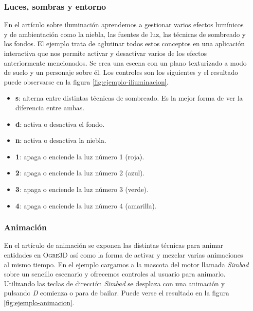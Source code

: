 
\subsubsection{Luces, sombras y entorno}

En el artículo sobre iluminación aprendemos a gestionar varios efectos
lumínicos y de ambientación como la niebla, las fuentes de luz, las técnicas
de sombreado y los fondos. El ejemplo trata de aglutinar todos estos conceptos
en una aplicación interactiva que nos permite activar y desactivar varios
de los efectos anteriormente mencionados. Se crea una escena con un
plano texturizado a modo de suelo y un personaje sobre él. Los controles
son los siguientes y el resultado puede observarse en la figura \ref{fig:ejemplo-iliuminacion}.

\begin{itemize}
    \itemsep0em
    \item \textbf{s}: alterna entre distintas técnicas de sombreado. Es
    la mejor forma de ver la diferencia entre ambas.
    \item \textbf{d}: activa o desactiva el fondo.
    \item \textbf{n}: activa o desactiva la niebla.
    \item \textbf{1}: apaga o enciende la luz número 1 (roja).
    \item \textbf{2}: apaga o enciende la luz número 2 (azul).
    \item \textbf{3}: apaga o enciende la luz número 3 (verde).
    \item \textbf{4}: apaga o enciende la luz número 4 (amarilla).
\end{itemize}


\subsubsection{Animación}

En el artículo de animación se exponen las distintas técnicas para animar
entidades en \textsc{Ogre3D} así como la forma de activar y mezclar
varias animaciones al mismo tiempo. En el ejemplo cargamos a la mascota del
motor llamada \textit{Simbad} sobre un sencillo escenario y ofrecemos
controles al usuario para animarlo. Utilizando las teclas de dirección
\textit{Simbad} se desplaza con una animación y pulsando \textit{D} comienza
o para de bailar. Puede verse el resultado en la figura \ref{fig:ejemplo-animacion}.\\


